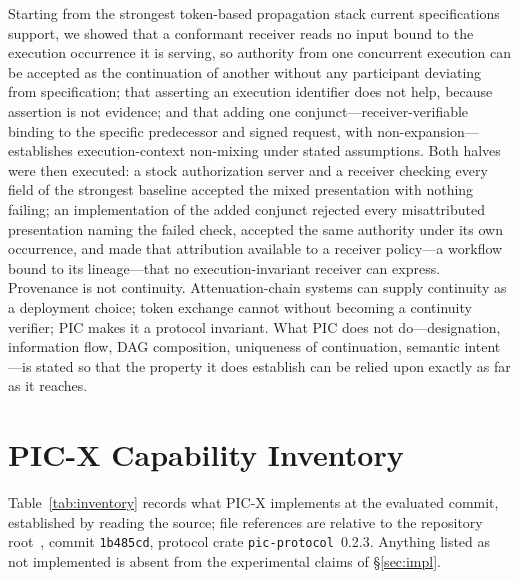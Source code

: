 \documentclass[conference]{IEEEtran}
\begin{document}
Starting from the strongest token-based propagation stack current specifications support, we showed that a conformant receiver reads no input bound to the execution occurrence it is serving, so authority from one concurrent execution can be accepted as the continuation of another without any participant deviating from specification; that asserting an execution identifier does not help, because assertion is not evidence; and that adding one conjunct---receiver-verifiable binding to the specific predecessor and signed request, with non-expansion---establishes execution-context non-mixing under stated assumptions. Both halves were then executed: a stock authorization server and a receiver checking every field of the strongest baseline accepted the mixed presentation with nothing failing; an implementation of the added conjunct rejected every misattributed presentation naming the failed check, accepted the same authority under its own occurrence, and made that attribution available to a receiver policy---a workflow bound to its lineage---that no execution-invariant receiver can express. Provenance is not continuity. Attenuation-chain systems can supply continuity as a deployment choice; token exchange cannot without becoming a continuity verifier; PIC makes it a protocol invariant. What PIC does not do---designation, information flow, DAG composition, uniqueness of continuation, semantic intent---is stated so that the property it does establish can be relied upon exactly as far as it reaches.

\appendices

\section{PIC-X Capability Inventory}\label{app:inventory}

Table~\ref{tab:inventory} records what PIC-X implements at the evaluated commit, established by reading the source; file references are relative to the repository root~\cite{picx}, commit \texttt{1b485cd}, protocol crate \texttt{pic-protocol}~0.2.3. Anything listed as not implemented is absent from the experimental claims of \S\ref{sec:impl}.
\end{document}
